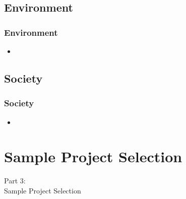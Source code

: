 \subsection{Environment}
\begin{frame}
    \frametitle{Environment}
    \vspace{3mm}
    \begin{itemize}
        \item
    \end{itemize}
\end{frame}

\subsection{Society}
\begin{frame}
    \frametitle{Society}
    \vspace{3mm}
    \begin{itemize}
        \item
    \end{itemize}
\end{frame}

\section{Sample Project Selection}
\begin{frame}
    \vspace{25mm}
    \begin{center}
        \Huge{Part 3:\\Sample Project Selection}
    \end{center}
\end{frame}

